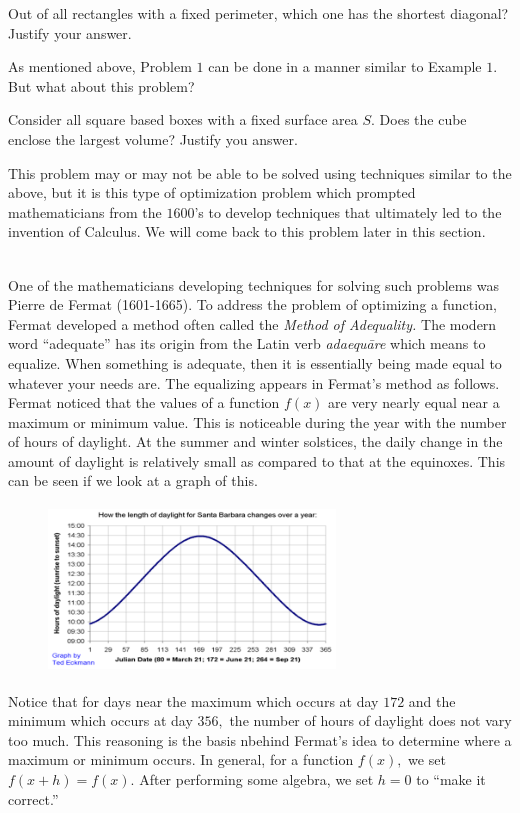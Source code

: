   Out of all rectangles with a fixed
perimeter, which one has the shortest diagonal?  Justify your answer. 

As mentioned above, Problem $1$ can be done in a manner similar to
Example $1.$  But what about this problem?

  Consider all square based boxes with a
fixed surface area $S.$ Does the cube enclose the largest volume?
Justify you answer.

This problem may or may not be able to be solved using techniques
similar to the above, but it is this type of optimization problem
which prompted mathematicians from the $1600$'s to develop techniques
that ultimately led to the invention of Calculus.  We will come back
to this problem later in this section.  

\\

One of the mathematicians developing techniques for solving such
problems was Pierre de Fermat (1601-1665).  To address the problem of
optimizing a function, Fermat developed a method often called the
\emph{Method of Adequality.}  The modern word ``adequate'' has its origin from
the Latin verb \emph{adaequ\={a}re} which means to equalize.  When something is
adequate, then it is essentially being made equal to whatever your
needs are.  The equalizing appears in Fermat's method as follows.
Fermat noticed that the values of a function $f(x)$ are very nearly
equal near a maximum or minimum value.  This is noticeable during the
year with the number of hours of daylight.  At the summer and winter
solstices, the daily change in the amount of daylight is relatively
small as compared to that at the equinoxes.  This can be seen if we
look at a graph of this. 

\begin{figure}
\captionsetup{labelformat=empty}
\centerline{\includegraphics*[height=1.75in,width=3in]{Figures/SantaBarbaraDaylight}}
\label{fig:}
\end{figure}
Notice that for days near the maximum which occurs at day $172$ and the
minimum which occurs at day $356,$ the number of hours of daylight does
not vary too much.  This reasoning is the basis nbehind Fermat's idea
to determine where a maximum or minimum occurs.  In general, for a
function $f(x),$ we set $f(x+h)=f(x).$  After performing some algebra, we
set $h=0$ to ``make it correct.''
  
